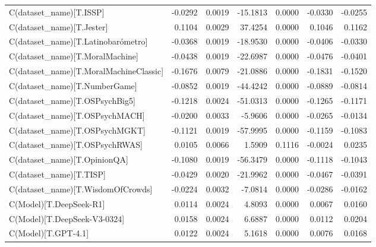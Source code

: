 \documentclass{article} %
\begin{document}
\begin{table}
\begin{center}
\begin{tabular}{lrrrrrr}
C(dataset\_name)[T.ISSP]                               & -0.0292 &   0.0019 &  -15.1813 &      0.0000 & -0.0330 & -0.0255  \\
C(dataset\_name)[T.Jester]                             &  0.1104 &   0.0029 &   37.4254 &      0.0000 &  0.1046 &  0.1162  \\
C(dataset\_name)[T.Latinobarómetro]                    & -0.0368 &   0.0019 &  -18.9530 &      0.0000 & -0.0406 & -0.0330  \\
C(dataset\_name)[T.MoralMachine]                       & -0.0438 &   0.0019 &  -22.6987 &      0.0000 & -0.0476 & -0.0401  \\
C(dataset\_name)[T.MoralMachineClassic]                & -0.1676 &   0.0079 &  -21.0886 &      0.0000 & -0.1831 & -0.1520  \\
C(dataset\_name)[T.NumberGame]                         & -0.0852 &   0.0019 &  -44.4242 &      0.0000 & -0.0889 & -0.0814  \\
C(dataset\_name)[T.OSPsychBig5]                        & -0.1218 &   0.0024 &  -51.0313 &      0.0000 & -0.1265 & -0.1171  \\
C(dataset\_name)[T.OSPsychMACH]                        & -0.0200 &   0.0033 &   -5.9606 &      0.0000 & -0.0265 & -0.0134  \\
C(dataset\_name)[T.OSPsychMGKT]                        & -0.1121 &   0.0019 &  -57.9995 &      0.0000 & -0.1159 & -0.1083  \\
C(dataset\_name)[T.OSPsychRWAS]                        &  0.0105 &   0.0066 &    1.5909 &      0.1116 & -0.0024 &  0.0235  \\
C(dataset\_name)[T.OpinionQA]                          & -0.1080 &   0.0019 &  -56.3479 &      0.0000 & -0.1118 & -0.1043  \\
C(dataset\_name)[T.TISP]                               & -0.0429 &   0.0020 &  -21.9962 &      0.0000 & -0.0467 & -0.0391  \\
C(dataset\_name)[T.WisdomOfCrowds]                     & -0.0224 &   0.0032 &   -7.0814 &      0.0000 & -0.0286 & -0.0162  \\
C(Model)[T.DeepSeek-R1]                                &  0.0114 &   0.0024 &    4.8093 &      0.0000 &  0.0067 &  0.0160  \\
C(Model)[T.DeepSeek-V3-0324]                           &  0.0158 &   0.0024 &    6.6887 &      0.0000 &  0.0112 &  0.0204  \\
C(Model)[T.GPT-4.1]                                    &  0.0122 &   0.0024 &    5.1618 &      0.0000 &  0.0076 &  0.0168  \\

\end{tabular}
\end{center}
\end{table}
\end{document}
